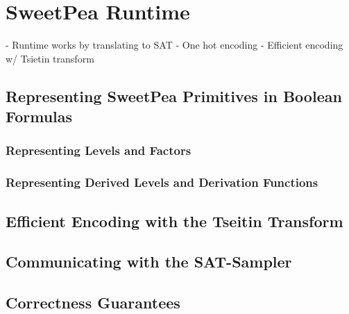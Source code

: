 
\chapter{SweetPea Runtime}

- Runtime works by translating to SAT
- One hot encoding
- Efficient encoding w/ Tsietin transform


\blah

\section{Representing SweetPea Primitives in Boolean Formulas}

\subsection{Representing Levels and Factors}

\subsection{Representing Derived Levels and Derivation Functions}

\blah

\section{Efficient Encoding with the Tseitin Transform}

\blah

\section{Communicating with the SAT-Sampler}

\blah

\section{Correctness Guarantees}

\blah
